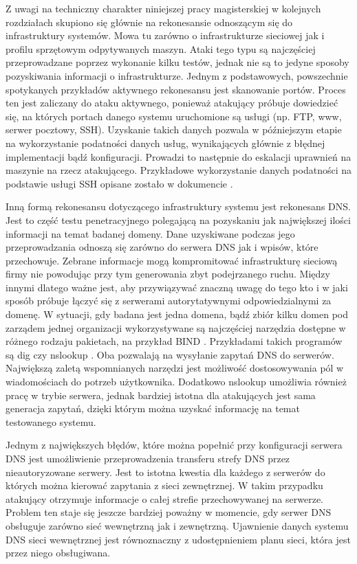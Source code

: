 Z uwagi na techniczny charakter niniejszej pracy magisterskiej w kolejnych rozdziałach skupiono się głównie na rekonesansie odnoszącym
się do infrastruktury systemów. Mowa tu zarówno o infrastrukturze sieciowej jak i profilu sprzętowym odpytywanych maszyn. Ataki tego typu
są najczęściej przeprowadzane poprzez wykonanie kilku testów, jednak nie są to jedyne sposoby pozyskiwania informacji o infrastrukturze.
Jednym z podstawowych, powszechnie spotykanych przykładów aktywnego rekonesansu jest skanowanie portów. Proces ten jest zaliczany
do ataku aktywnego, ponieważ atakujący próbuje dowiedzieć się, na których portach danego systemu uruchomione są usługi (np. FTP, www,
serwer pocztowy, SSH). Uzyskanie takich danych pozwala w późniejszym etapie na wykorzystanie podatności danych usług, wynikających
głównie z błędnej implementacji bądź konfiguracji. Prowadzi to następnie do eskalacji uprawnień na maszynie na rzecz atakującego.
Przykładowe wykorzystanie danych podatności na podstawie usługi SSH opisane zostało w dokumencie \cite{ssh_podatnosci}.

Inną formą rekonesansu dotyczącego infrastruktury systemu jest rekonesans DNS. Jest to część testu penetracyjnego polegającą na pozyskaniu jak największej ilości informacji na temat badanej domeny.
Dane uzyskiwane podczas jego przeprowadzania odnoszą się zarówno do serwera DNS jak i wpisów, które przechowuje. Zebrane informacje mogą
kompromitować infrastrukturę sieciową firmy nie powodując przy tym generowania zbyt podejrzanego ruchu. Między innymi dlatego
ważne jest, aby przywiązywać znaczną uwagę do tego kto i w jaki sposób próbuje łączyć się z serwerami autorytatywnymi odpowiedzialnymi
za domenę. W sytuacji, gdy badana jest jedna domena, bądź zbiór kilku domen pod zarządem jednej organizacji wykorzystywane są najczęściej
narzędzia dostępne w różnego rodzaju pakietach, na przykład BIND \cite{isc}. Przykładami takich programów są dig \cite{dig} czy
nslookup \cite{domain_example}. Oba pozwalają na wysyłanie zapytań DNS do serwerów. Największą zaletą wspomnianych narzędzi jest
możliwość dostosowywania pól w wiadomościach do potrzeb użytkownika. Dodatkowo nslookup umożliwia również pracę w trybie serwera,
jednak bardziej istotna dla atakujących jest sama generacja zapytań, dzięki którym można uzyskać informację na temat testowanego
systemu.

Jednym z największych błędów, które można popełnić przy konfiguracji serwera DNS jest umożliwienie przeprowadzenia transferu strefy
DNS przez nieautoryzowane serwery. Jest to istotna kwestia dla każdego z serwerów do których można kierować zapytania z sieci zewnętrznej.
W takim przypadku atakujący otrzymuje informacje o całej strefie przechowywanej na serwerze. Problem ten staje się jeszcze bardziej
poważny w momencie, gdy serwer DNS obsługuje zarówno sieć wewnętrzną jak i zewnętrzną. Ujawnienie danych systemu DNS sieci
wewnętrznej jest równoznaczny z udostępnieniem planu sieci, która jest przez niego obsługiwana.


